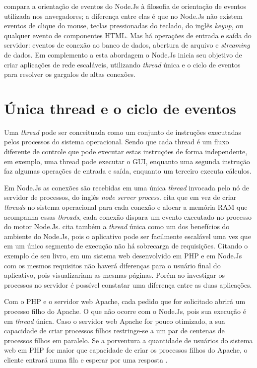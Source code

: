   compara a orientação de eventos do Node.Js à filosofia de orientação 
  de eventos utilizada nos navegadores; a diferença entre elas é que no Node.Js 
  não existem eventos de clique do mouse, teclas pressionadas do teclado, do inglês \textit{keyup}, ou qualquer evento de componentes HTML. 
  Mas há operações de entrada e saída do servidor: eventos de conexão ao banco de dados, abertura de arquivo e \textit{streaming}
  de dados. Em complemento a esta abordagem o Node.Js inicia seu objetivo de criar aplicações de rede escaláveis, utilizando \textit{thread} única
  e o ciclo de eventos para resolver os gargalos de altas conexões.

\section{Única thread e o ciclo de eventos}
\label{single-thread}

  Uma \textit{thread} pode ser conceituada como um conjunto de instruções executadas pelos processos do sistema operacional.
  Sendo que cada thread é um fluxo diferente de controle que pode executar estas instruções de forma independente, em exemplo,
  uma thread pode executar o GUI, enquanto uma segunda instrução faz algumas operações de entrada e saída, 
  enquanto um terceiro executa cálculos. \cite{lewis}
  
  Em Node.Js as conexões são recebidas em uma única \textit{thread} invocada pelo nó de servidor de processos, do inglês \textit{node server process}.
   cita que em vez de criar \textit{threads}
  no sistema operacional para cada conexão e alocar a memória RAM que acompanha essas \textit{threads}, 
  cada conexão dispara um evento executado no processo do motor Node.Js.   
   cita também a \textit{thread} única como um dos benefícios do ambiente do Node.Js, 
  pois o aplicativo pode ser facilmente escalável uma vez que em um único segmento de execução não há sobrecarga 
  de requisições. Citando o exemplo de seu livro, em um sistema web desenvolvido em \ac{PHP} e em Node.Js com os mesmos requisitos
  não haverá diferenças para o usuário final do aplicativo, pois visualizariam as mesmas páginas. Porém ao investigar 
  os processos no servidor é possível constatar uma diferença entre as duas aplicações.
  
  Com o \ac{PHP} e o servidor web Apache, cada pedido que for solicitado abrirá um processo filho do Apache. O que não ocorre 
  com o Node.Js, pois sua execução é em \textit{thread} única.  Caso o servidor web Apache for pouco otimizado, a sua capacidade 
  de criar processos filhos restringe-se a um par de centenas de processos filhos em paralelo. Se a porventura a quantidade 
  de usuários do sistema web em \ac{PHP} for maior que capacidade de criar os processos filhos do Apache, o cliente entrará 
  numa fila e esperar por uma resposta \cite{powers}.

